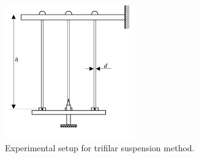 \begin{figure}[H]
\centering
\includegraphics[width=0.5\textwidth]{chapters/lab1/m2}
\caption{Experimental setup for trifilar suspension method.}
\label{fig:mesh2}
\end{figure}